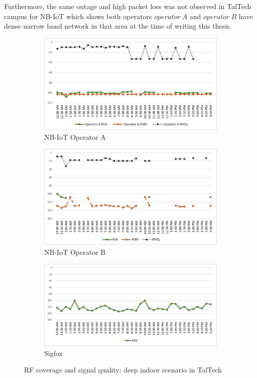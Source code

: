 \documentclass[12pt]{article}
\begin{document}
Furthermore, the same outage and high packet loss was not observed in TalTech campus for NB-IoT which shows both operators $operator\ A$ and $operator\ B$ have dense narrow band network in that area at the time of writing this thesis.





 \begin{figure}[H]
\begin{subfigure}[t]{\linewidth}
  \centering
  \includegraphics[width=.5\linewidth]{Images/tallinn/ATallinnDeepIndoor.pdf}  
  \caption{NB-IoT Operator A}
\end{subfigure}
\begin{subfigure}[t]{\linewidth}
  \centering
  \includegraphics[width=.5\linewidth]{Images/tallinn/BTallinnDeepIndoor.pdf}  
  \caption{NB-IoT Operator B}
  
\end{subfigure}
\begin{subfigure}[t]{\linewidth}
  \centering
  \includegraphics[width=.5\linewidth]{Images/tallinn/STallinnDeepIndoor.pdf}  
\caption{Sigfox}
 \end{subfigure}
\caption{RF coverage and signal quality: deep indoor scenario in TalTech}
 \label{RFDeepIndoorTallinn}
\end{figure}
\end{document}
